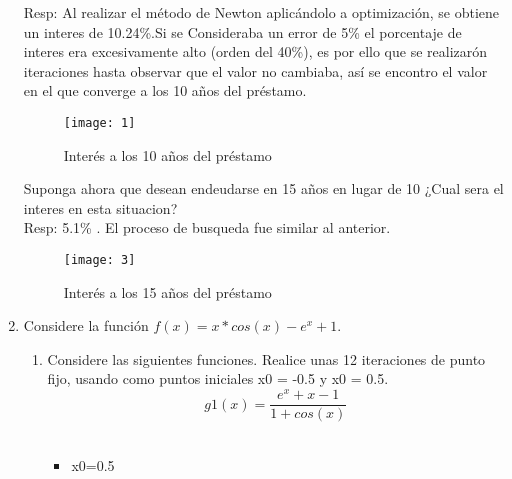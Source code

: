 \documentclass{udpreport}
\begin{document}
\begin{enumerate}
Resp: Al realizar el método de Newton aplicándolo a optimización, se obtiene un interes de 10.24\%.Si se Consideraba un error de 5\% el porcentaje de interes era excesivamente alto (orden del 40\%), es por ello que se realizarón iteraciones hasta observar que el valor no cambiaba, así se encontro el valor en el que converge a los 10 años del préstamo.

\begin{figure}[H]
    \centering
    \texttt{[image: 1]}
    \caption{Interés a los 10 años del préstamo}
\end{figure}
Suponga ahora que desean endeudarse en 15 años en lugar de 10 ¿Cual sera el interes en esta situacion?
\\
Resp: 5.1\% . El proceso de busqueda fue similar al anterior.
\\
\begin{figure}[H]
    \centering
    \texttt{[image: 3]}
    \caption{Interés a los 15 años del préstamo}
\end{figure}
\newpage


\item Considere la función \(f(x) = x*cos(x)-e^x+ 1\). %
\begin{enumerate}
    
\vspace{0.9cm}
\item Considere las siguientes funciones. Realice unas 12 iteraciones de punto fijo, usando como puntos iniciales x0 = -0.5 y x0 = 0.5.\\ 


\begin{equation}
 g1(x) = \frac{e^x+x-1}
{1 + cos(x)}
\end{equation}
\\
\begin{itemize}
\item x0=0.5
\end{itemize}


\begin{table}[H]
    \centering
        \begin{tabular} { |c|c|}
        

\end{tabular}
\end{table}
\end{enumerate}
\end{enumerate}
\end{document}
